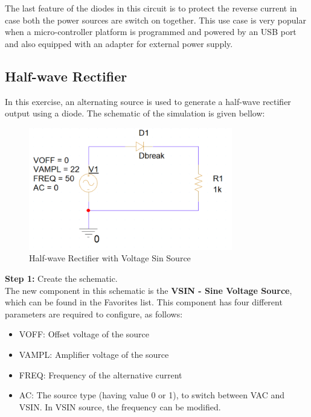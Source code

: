 The last feature of the diodes in this circuit is  to protect the reverse current in case both the power sources are switch on together. This use case is very popular when a micro-controller platform is programmed and powered by an USB port and also equipped with an adapter for external power supply.

\subsection{Half-wave Rectifier}
\label{halfwaveRectifier}
In this exercise, an alternating source is used to generate a half-wave rectifier output using a diode. The schematic of the simulation is given bellow:

\begin{figure}[!htp]
    \label{pic:halfwave_rectifier}
    \centering
    \includegraphics[width = 3.5in]{source/picture/bai_2/diode_6.PNG}
    \caption{Half-wave Rectifier with Voltage Sin Source}
    \label{lab02_ex031}
\end{figure}

\textbf{Step 1: } Create the schematic.\\
The new component in this schematic is the \textbf{VSIN - Sine Voltage Source}, which can be found in the Favorites list. This component has four different parameters are required to configure, as follows:
\begin{itemize}
    \item VOFF: Offset voltage of the source
    \item VAMPL: Amplifier voltage of the source
    \item FREQ: Frequency of the alternative current
    \item AC: The source type (having value 0 or 1), to switch between VAC and VSIN. In VSIN source, the frequency can be modified.
\end{itemize}

